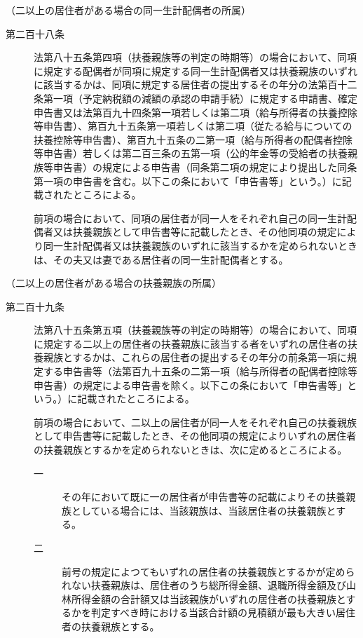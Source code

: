 \documentclass[twocolumn,a4j,10pt]{ltjtarticle}
\begin{document}
\noindent\hspace{10pt}（二以上の居住者がある場合の同一生計配偶者の所属）
\begin{description}
\item[第二百十八条]法第八十五条第四項（扶養親族等の判定の時期等）の場合において、同項に規定する配偶者が同項に規定する同一生計配偶者又は扶養親族のいずれに該当するかは、同項に規定する居住者の提出するその年分の法第百十二条第一項（予定納税額の減額の承認の申請手続）に規定する申請書、確定申告書又は法第百九十四条第一項若しくは第二項（給与所得者の扶養控除等申告書）、第百九十五条第一項若しくは第二項（従たる給与についての扶養控除等申告書）、第百九十五条の二第一項（給与所得者の配偶者控除等申告書）若しくは第二百三条の五第一項（公的年金等の受給者の扶養親族等申告書）の規定による申告書（同条第二項の規定により提出した同条第一項の申告書を含む。以下この条において「申告書等」という。）に記載されたところによる。
\item[]前項の場合において、同項の居住者が同一人をそれぞれ自己の同一生計配偶者又は扶養親族として申告書等に記載したとき、その他同項の規定により同一生計配偶者又は扶養親族のいずれに該当するかを定められないときは、その夫又は妻である居住者の同一生計配偶者とする。
\end{description}
\noindent\hspace{10pt}（二以上の居住者がある場合の扶養親族の所属）
\begin{description}
\item[第二百十九条]法第八十五条第五項（扶養親族等の判定の時期等）の場合において、同項に規定する二以上の居住者の扶養親族に該当する者をいずれの居住者の扶養親族とするかは、これらの居住者の提出するその年分の前条第一項に規定する申告書等（法第百九十五条の二第一項（給与所得者の配偶者控除等申告書）の規定による申告書を除く。以下この条において「申告書等」という。）に記載されたところによる。
\item[]前項の場合において、二以上の居住者が同一人をそれぞれ自己の扶養親族として申告書等に記載したとき、その他同項の規定によりいずれの居住者の扶養親族とするかを定められないときは、次に定めるところによる。
\begin{description}
\item[一]その年において既に一の居住者が申告書等の記載によりその扶養親族としている場合には、当該親族は、当該居住者の扶養親族とする。
\item[二]前号の規定によつてもいずれの居住者の扶養親族とするかが定められない扶養親族は、居住者のうち総所得金額、退職所得金額及び山林所得金額の合計額又は当該親族がいずれの居住者の扶養親族とするかを判定すべき時における当該合計額の見積額が最も大きい居住者の扶養親族とする。
\end{description}
\end{description}
\end{document}
